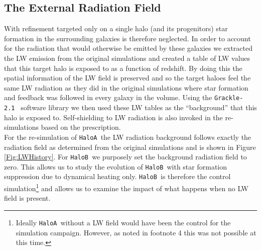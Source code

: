 \documentclass[twocolumn,iop,revtex4]{openjournal}
\newcommand{\grackle}{\texttt{Grackle-2.1~}}
\newcommand{\ha} {\texttt{HaloA~}}
\newcommand{\hb} {\texttt{HaloB~}}
\begin{document}
 \subsection{The External Radiation Field} \label{Sec:LWRadField}
 With refinement targeted only on a single halo (and its progenitors) star formation in the
 surrounding galaxies is therefore neglected. In order to account for the radiation that would
 otherwise be emitted by these galaxies we extracted the LW emission from the original simulations
 and created a table of LW values that this target halo is exposed to as a function of
 redshift. By doing this the spatial information of the LW field is preserved and so the target haloes feel the same LW radiation as they did in the original simulations where star formation and feedback was followed in every galaxy in the volume. Using the \grackle \citep{Grackle} software library we then used these LW tables as
 the ``background'' that this halo is exposed to. Self-shielding to LW radiation is also invoked in
 the re-simulations based on the \cite{Wolcott-Green_2011} prescription.\\
 \indent For the re-simulation of \ha the LW radiation background follows exactly the radiation
 field as determined from the original simulations and is shown in Figure \ref{Fig:LWHistory}.
 For \hb we purposely set the background radiation field to zero. This allows us to study the
 evolution of \hb with star formation suppression due to dynamical heating only. \hb is therefore
 the control simulation\footnote{Ideally \ha without a LW field would have been the
     control for
   the simulation campaign. However, as noted in footnote 4 this was not possible at this
   time.} and allows us to examine the impact of what happens when
 no LW field is present. 
 
\end{document}
